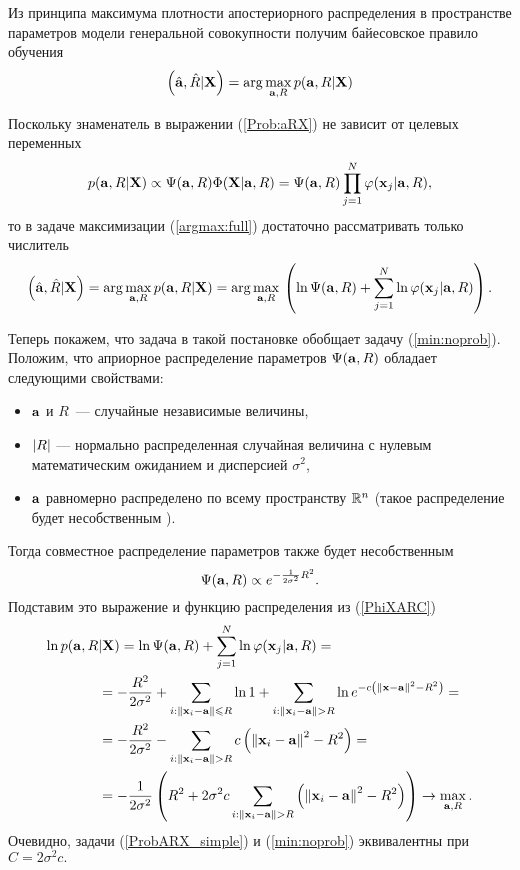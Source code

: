 Из принципа максимума плотности апостериорного распределения в пространстве параметров модели генеральной совокупности получим байесовское правило обучения
\begin{equation}
	\label{argmax:full}
	\left(\hat{\boldsymbol{\mathbf{a}}},\hat R|\boldsymbol{\mathbf{X}}\right) = \arg\underset{\boldsymbol{\mathbf{a}},R}\max\, p(\boldsymbol{\mathbf{a}},R|\boldsymbol{\mathbf{X}})
\end{equation}

Поскольку знаменатель в выражении (\ref{Prob:aRX}) не зависит от целевых переменных 
$$p(\boldsymbol{\mathbf{a}},R|\boldsymbol{\mathbf{X}}) 
	\propto \Psi(\boldsymbol{\mathbf{a}},R) \Phi(\boldsymbol{\mathbf{X}}|\boldsymbol{\mathbf{a}},R) 
	=  \Psi(\boldsymbol{\mathbf{a}},R) \prod_{j=1}^N \varphi(\boldsymbol{\mathbf{x}}_j|\boldsymbol{\mathbf{a}},R),$$
то в задаче максимизации (\ref{argmax:full}) достаточно рассматривать только числитель
$$\left(\hat{\boldsymbol{\mathbf{a}}},\hat R|\boldsymbol{\mathbf{X}}\right)
	= \arg\underset{\boldsymbol{\mathbf{a}},R}\max\, p(\boldsymbol{\mathbf{a}},R|\boldsymbol{\mathbf{X}}) 
	= \arg\underset{\boldsymbol{\mathbf{a}},R}\max\, \left(\ln\Psi(\boldsymbol{\mathbf{a}},R) + \sum_{j=1}^N\ln\varphi(\boldsymbol{\mathbf{x}}_j|\boldsymbol{\mathbf{a}},R)\right). $$

Теперь покажем, что задача в такой постановке обобщает задачу (\ref{min:noprob}). 
Положим, что априорное распределение параметров $\Psi(\boldsymbol{\mathbf{a}},R)$ обладает следующими свойствами:
\begin{itemize}
 	\item $\boldsymbol{\mathbf{a}}$ и $R$~--- случайные независимые величины,
 	\item $\left|R\right|$ --- нормально распределенная случайная величина с нулевым математическим ожиданием и дисперсией $\sigma^2$,
 	\item $\boldsymbol{\mathbf{a}}$ равномерно распределено по всему пространству $\mathbb{R}^n$ (такое распределение будет несобственным \cite{Groot1974}).
 \end{itemize} 
 Тогда совместное распределение параметров также будет несобственным 
 $$\Psi(\boldsymbol{\mathbf{a}},R)\propto e^{-\frac1{2\sigma^2}R^2}.$$
 Подставим это выражение и функцию распределения из (\ref{PhiXARC})
 \begin{align}
 	\label{ProbARX_simple}
 	\ln p(\boldsymbol{\mathbf{a}},R&|\boldsymbol{\mathbf{X}}) 
 		=	\ln\Psi(\boldsymbol{\mathbf{a}},R) + \sum_{j=1}^N\ln\varphi(\boldsymbol{\mathbf{x}}_j|\boldsymbol{\mathbf{a}},R) =\notag \\
 		&= 	-\frac{R^2}{2\sigma^2} + \sum_{i: \left\|{\boldsymbol{\mathbf{x}}_i - \boldsymbol{\mathbf{a}}}\right\| \leqslant R} \ln 1 
 			+ \sum_{i: \left\|{\boldsymbol{\mathbf{x}}_i - \boldsymbol{\mathbf{a}}}\right\| > R} \ln e^{-c \left(\left\|{\boldsymbol{\mathbf{x}}-\boldsymbol{\mathbf{a}}}\right\|^2-R^2\right)}  = \notag \\
 		&= -\frac{R^2}{2\sigma^2} - \sum_{i: \left\|{\boldsymbol{\mathbf{x}}_i - \boldsymbol{\mathbf{a}}}\right\| > R} c\left(\left\|{\boldsymbol{\mathbf{x}}_i - \boldsymbol{\mathbf{a}}}\right\|^2 - R^2\right) = \notag \\
 		&= -\frac1{2\sigma^2}\left(R^2 + 2\sigma^2 c\sum_{i: \left\|{\boldsymbol{\mathbf{x}}_i - \boldsymbol{\mathbf{a}}}\right\| > R} \left(\left\|{\boldsymbol{\mathbf{x}}_i - \boldsymbol{\mathbf{a}}}\right\|^2 -R^2\right)\right) \to \max_{\boldsymbol{\mathbf{a}}, R}.
 \end{align}
 Очевидно, задачи (\ref{ProbARX_simple}) и (\ref{min:noprob}) эквивалентны при $C = 2\sigma^2 c.$

 